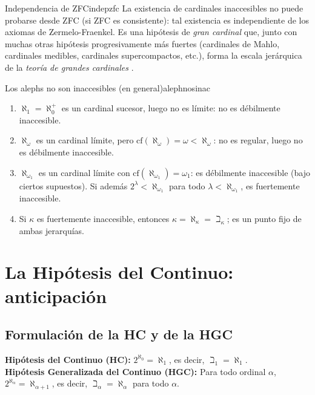\begin{observacion}{Independencia de ZFC}{indepzfc}
La existencia de cardinales inaccesibles no puede probarse desde ZFC (si ZFC es consistente): tal existencia es independiente de los axiomas de Zermelo-Fraenkel. Es una hipótesis de \emph{gran cardinal} que, junto con muchas otras hipótesis progresivamente más fuertes (cardinales de Mahlo, cardinales medibles, cardinales supercompactos, etc.), forma la escala jerárquica de la \emph{teoría de grandes cardinales} \cite{kanamori2003}.
\end{observacion}

\begin{ejemplo}{Los alephs no son inaccesibles (en general)}{alephnosinac}
\begin{enumerate}[leftmargin=2em, label=(\alph*)]
  \item $\aleph_1 = \aleph_0^+$ es un cardinal sucesor, luego no es límite: no es débilmente inaccesible.
  \item $\aleph_\omega$ es un cardinal límite, pero $\mathrm{cf}(\aleph_\omega) = \omega < \aleph_\omega$: no es regular, luego no es débilmente inaccesible.
  \item $\aleph_{\omega_1}$ es un cardinal límite con $\mathrm{cf}(\aleph_{\omega_1}) = \omega_1$: es débilmente inaccesible (bajo ciertos supuestos). Si además $2^\lambda < \aleph_{\omega_1}$ para todo $\lambda < \aleph_{\omega_1}$, es fuertemente inaccesible.
  \item Si $\kappa$ es fuertemente inaccesible, entonces $\kappa = \aleph_\kappa = \beth_\kappa$; es un punto fijo de ambas jerarquías.
\end{enumerate}
\end{ejemplo}

\section{La Hipótesis del Continuo: anticipación}

\subsection{Formulación de la HC y de la HGC}

\begin{importante}
\textbf{Hipótesis del Continuo (HC):} $2^{\aleph_0} = \aleph_1$, es decir, $\beth_1 = \aleph_1$.\\[0.3em]
\textbf{Hipótesis Generalizada del Continuo (HGC):} Para todo ordinal $\alpha$, $2^{\aleph_\alpha} = \aleph_{\alpha+1}$, es decir, $\beth_\alpha = \aleph_\alpha$ para todo $\alpha$.
\end{importante}

